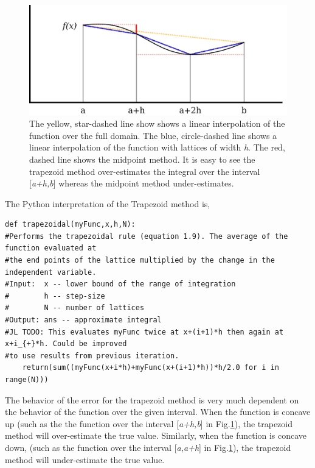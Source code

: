 \documentclass[10pt]{article}
\begin{document}
\begin{figure}[!ht]
    \begin{center}
	\includegraphics[width=\columnwidth]{interpolation.png}
	\caption{The yellow, star-dashed line show shows a linear interpolation of the function over the full domain. The blue, circle-dashed line shows a linear interpolation of the function with lattices of width \textit{h}. The red, dashed line shows the midpoint method. It is easy to see the trapezoid method over-estimates the integral over the interval [\textit{a+h,b}] whereas the midpoint method under-estimates.}
	\label{fig:interpolation}
	\end{center}
\end{figure}
    
The Python interpretation of the Trapezoid method is,
\begin{lstlisting}
def trapezoidal(myFunc,x,h,N):
#Performs the trapezoidal rule (equation 1.9). The average of the function evaluated at
#the end points of the lattice multiplied by the change in the independent variable.
#Input:  x -- lower bound of the range of integration
#        h -- step-size
#        N -- number of lattices
#Output: ans -- approximate integral
#JL TODO: This evaluates myFunc twice at x+(i+1)*h then again at x+i_{+}*h. Could be improved 
#to use results from previous iteration.
    return(sum((myFunc(x+i*h)+myFunc(x+(i+1)*h))*h/2.0 for i in range(N)))
\end{lstlisting}

The behavior of the error for the trapezoid method is very much dependent on the behavior of the function over the given interval. When the function is concave up (such as the the function over the interval [\textit{a+h,b}] in Fig.\ref{fig:interpolation}), the trapezoid method will over-estimate the true value. Similarly, when the function is concave down, (such as the function over the interval [\textit{a,a+h}] in Fig.\ref{fig:interpolation}), the trapezoid method will under-estimate the true value. 
\end{document}
